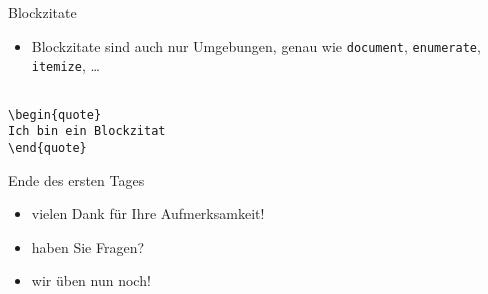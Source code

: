 \begin{frame}[fragile]{Blockzitate}
\begin{itemize}
\itemsep1pt\parskip0pt
\item
  Blockzitate sind auch nur Umgebungen, genau wie \texttt{document},
  \texttt{enumerate}, \texttt{itemize}, \ldots{}
\end{itemize}
\begin{verbatim}

\begin{quote}
Ich bin ein Blockzitat
\end{quote}
\end{verbatim}
\end{frame}

\begin{frame}[fragile]{Ende des ersten Tages}
\begin{itemize}
\itemsep1pt\parskip0pt
\item vielen Dank für Ihre Aufmerksamkeit!
\item haben Sie Fragen?
\item wir üben nun noch!
\end{itemize}

\end{frame}
